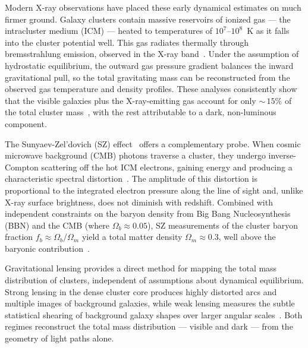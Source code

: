 Modern X-ray observations have placed these early dynamical estimates on much firmer ground.
Galaxy clusters contain massive reservoirs of ionized gas --- the intracluster medium (ICM) --- heated to temperatures of $10^7$--$10^8$~K as it falls into the cluster potential well.
This gas radiates thermally through bremsstrahlung emission, observed in the X-ray band~\cite{Sarazin:1986zz}.
Under the assumption of hydrostatic equilibrium, the outward gas pressure gradient balances the inward gravitational pull, so the total gravitating mass can be reconstructed from the observed gas temperature and density profiles.
These analyses consistently show that the visible galaxies plus the X-ray-emitting gas account for only ${\sim}\,15\%$ of the total cluster mass~\cite{Cirelli:2024ssz}, with the rest attributable to a dark, non-luminous component.

The Sunyaev-Zel'dovich (SZ) effect~\cite{Sunyaev:1972} offers a complementary probe.
When cosmic microwave background (CMB) photons traverse a cluster, they undergo inverse-Compton scattering off the hot ICM electrons, gaining energy and producing a characteristic spectral distortion~\cite{Cirelli:2024ssz,Bullock:2017xww}.
The amplitude of this distortion is proportional to the integrated electron pressure along the line of sight and, unlike X-ray surface brightness, does not diminish with redshift.
Combined with independent constraints on the baryon density from Big Bang Nucleosynthesis (BBN) and the CMB (where $\Omega_b \approx 0.05$), SZ measurements of the cluster baryon fraction $f_b \approx \Omega_b / \Omega_m$ yield a total matter density $\Omega_m \approx 0.3$, well above the baryonic contribution~\cite{Aghanim:2018eyx,Cirelli:2024ssz}.

Gravitational lensing provides a direct method for mapping the total mass distribution of clusters, independent of assumptions about dynamical equilibrium.
Strong lensing in the dense cluster core produces highly distorted arcs and multiple images of background galaxies, while weak lensing measures the subtle statistical shearing of background galaxy shapes over larger angular scales~\cite{Cirelli:2024ssz,Bullock:2017xww}.
Both regimes reconstruct the total mass distribution --- visible and dark --- from the geometry of light paths alone.

